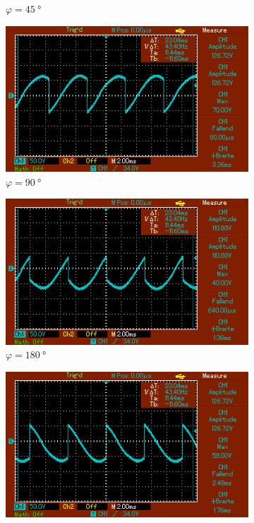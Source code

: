 \begin{figure}
\begin{subfigure}{0.3\textwidth}
        \caption{$\varphi = \SI{45}{\degree}$}
        \label{fig:1_45}
    \end{subfigure}
    \begin{subfigure}{0.3\textwidth}
        \centering
        \includegraphics[width=\textwidth]{images/1_90.png}
        \caption{$\varphi = \SI{90}{\degree}$}
        \label{fig:1_90}
    \end{subfigure}
    \par\medskip %
    \begin{subfigure}{0.3\textwidth}
        \centering
        \includegraphics[width=\textwidth]{images/1_180.png}
        \caption{$\varphi = \SI{180}{\degree}$}
        \label{fig:1_180}
    \end{subfigure}
    \begin{subfigure}{0.3\textwidth}
        \centering
        \includegraphics[width=\textwidth]{images/1_270.png}

\end{subfigure}
\end{figure}
